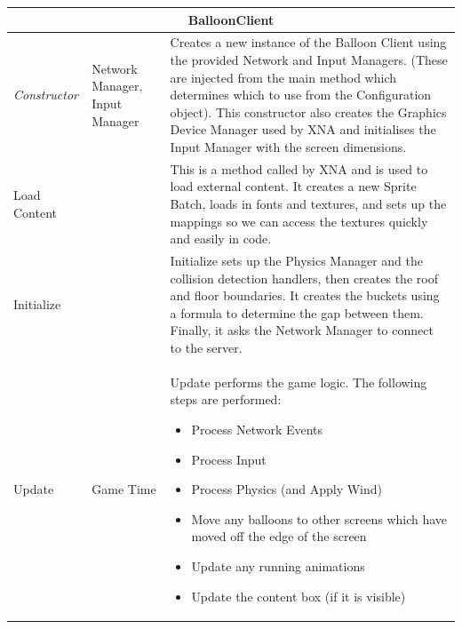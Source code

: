 \begin{table}
\begin{tabular}{|p{3cm}|p{3.6cm}|p{9cm}|}
\hline
\multicolumn{3}{|c|}{BalloonClient} \\ \hline
\emph{Constructor} & Network Manager, Input Manager & 
Creates a new instance of the Balloon Client using the provided Network and 
Input Managers. (These are injected from the main method which determines which
to use from the Configuration object). This constructor also creates the 
Graphics Device Manager used by XNA and initialises the Input Manager with the
screen dimensions. \\ \hline

Load Content & & 
This is a method called by XNA and is used to load external content. It creates
a new Sprite Batch, loads in fonts and textures, and sets up the mappings so we
can access the textures quickly and easily in code. \\ \hline

Initialize & &
Initialize sets up the Physics Manager and the collision detection handlers, 
then creates the roof and floor boundaries. It creates the buckets using a 
formula to determine the gap between them. Finally, it asks the Network Manager
to connect to the server. \\ \hline

Update & Game Time &
Update performs the game logic. The following steps are performed:
\begin{itemize}
	\item{Process Network Events}
	\item{Process Input}
	\item{Process Physics (and Apply Wind)}
	\item{Move any balloons to other screens which have moved off the edge of the screen}
	\item{Update any running animations}
	\item{Update the content box (if it is visible)}
\end{itemize}
\\ \hline


\end{tabular}
\end{table}
